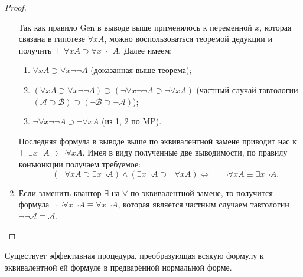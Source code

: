 \begin{proof}
\begin{enumerate}[label=\arabic*)]
\begin{enumerate}[label=\arabic*.]
        \end{enumerate}
        Так как правило Gen в выводе выше применялось к переменной $x$, которая связана в гипотезе $\forall xA$, можно воспользоваться теоремой дедукции и получить $\vdash \forall xA \supset \forall x\neg\neg A$. Далее имеем:
        \begin{enumerate}[label=\arabic*.]
            \item $\forall xA \supset \forall x\neg\neg A$ (доказанная выше теорема);
            \item $(\forall xA \supset \forall x\neg\neg A) \supset (\neg\forall x\neg\neg A \supset \neg\forall xA)$ (частный случай тавтологии $(\mathcal{A} \supset \mathcal{B}) \supset (\neg\mathcal{B} \supset \neg\mathcal{A})$);
            \item $\neg\forall x\neg\neg A \supset \neg\forall xA$ (из 1, 2 по MP).
        \end{enumerate}
        Последняя формула в выводе выше по эквивалентной замене приводит нас к $\vdash \exists x\neg A \supset \neg\forall xA$. Имея в виду полученные две выводимости, по правилу конъюнкции получаем требуемое:
        \[
            \vdash (\neg \forall xA \supset \exists x\neg A) \land (\exists x\neg A \supset \neg\forall xA) \Longleftrightarrow\ \vdash \neg \forall xA \equiv \exists x\neg A.
        \]

        \item Если заменить квантор $\exists$ на $\forall$ по эквивалентной замене, то получится формула $\neg\neg\forall x\neg A \equiv \forall x\neg A$, которая является частным случаем тавтологии $\neg\neg\mathcal{A} \equiv \mathcal{A}$.
    \end{enumerate}
\end{proof}
\begin{lemma}
    Существует эффективная процедура, преобразующая всякую формулу к эквивалентной ей формуле в предварённой нормальной форме.
\end{lemma}

